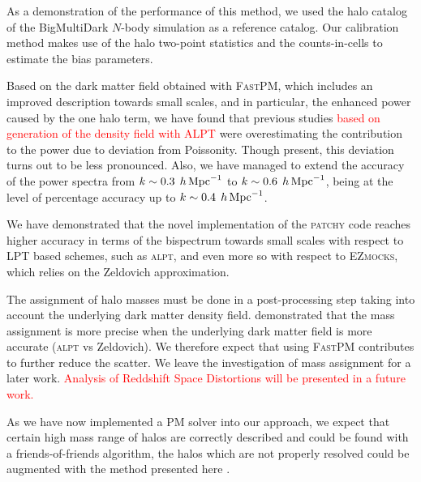 \documentclass[english,usenatbib]{mn2e}
\newcommand{\tod}[1]{{\textcolor{red}{ #1}}}
\newcommand{\hperm}{\,h\,{\rm Mpc}^{-1}}
\begin{document}
As a demonstration of the performance of this method, we used the halo catalog of the BigMultiDark $N$-body simulation as a reference catalog. Our calibration method makes use of the halo two-point statistics and the counts-in-cells to estimate the bias parameters. 

Based on the dark matter field obtained with \textsc{FastPM}, which includes an improved description towards small scales, and in particular, the enhanced power caused by the one halo term, we have found that previous studies \tod{based on generation of the density field with \textsc{ALPT}} were overestimating the contribution to the power due to deviation from Poissonity. Though present, this deviation turns out to be less pronounced. Also, we have managed to extend the accuracy of the power spectra from $k\sim 0.3\; \hperm$ to $k\sim 0.6 \;\hperm$, being at the level of percentage accuracy up to $k\sim 0.4\; \hperm$.

We have demonstrated that the novel implementation of the \textsc{patchy} code reaches higher accuracy in terms of the bispectrum towards small scales with respect to  LPT based schemes, such as \textsc{alpt}, and even more so with respect to \textsc{EZmocks}, which relies on the Zeldovich approximation. 

The assignment of halo masses must be done in a post-processing step taking into account the underlying dark matter density field. \citet{zhao2015} demonstrated that the mass assignment is more precise when the underlying dark matter field is more accurate (\textsc{alpt} vs Zeldovich). We therefore expect that using \textsc{FastPM} contributes to further reduce the scatter. We leave the investigation of mass assignment for a later work. \tod{Analysis of Reddshift Space Distortions will be presented in a future work.}


As we have now implemented a PM solver into our approach, we expect that certain high mass range of halos are correctly described and could be found with a friends-of-friends algorithm, the halos which are not properly resolved could be augmented with the method presented here  \citep[see methods to extend the resolution of $N$-body simulations,][]{delatorre,angulo2014,ahn2015}.  
\end{document}
